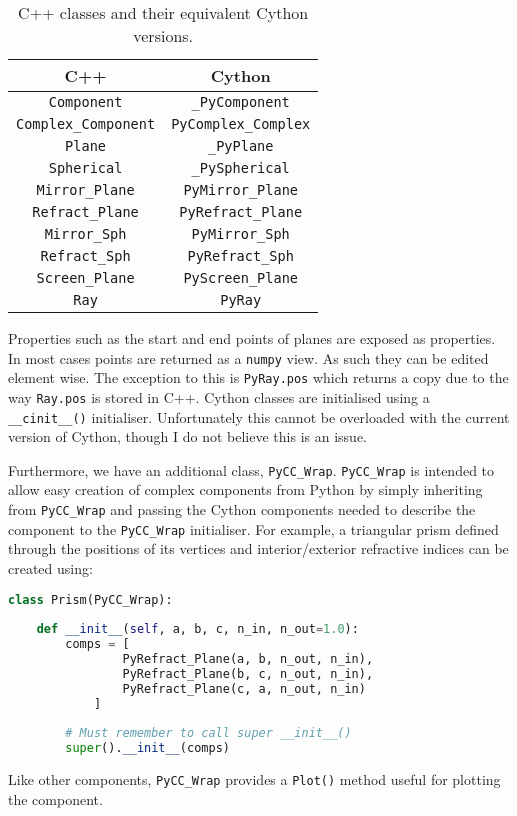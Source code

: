 \documentclass{article}
\begin{document}
\begin{table}[h!]
\centering
    \begin{tabular}{ |c|c| } 
         \hline
         C++ & Cython \\ 
         \hline
         \texttt{Component} & \texttt{\_PyComponent} \\ 
         \texttt{Complex\_Component} & \texttt{PyComplex\_Complex} \\ 
         \texttt{Plane} & \texttt{\_PyPlane} \\ 
         \texttt{Spherical} & \texttt{\_PySpherical} \\ 
         \texttt{Mirror\_Plane} & \texttt{PyMirror\_Plane} \\ 
         \texttt{Refract\_Plane} & \texttt{PyRefract\_Plane} \\ 
         \texttt{Mirror\_Sph} & \texttt{PyMirror\_Sph} \\ 
         \texttt{Refract\_Sph} & \texttt{PyRefract\_Sph} \\ 
         \texttt{Screen\_Plane} & \texttt{PyScreen\_Plane} \\
         \texttt{Ray} & \texttt{PyRay} \\ 
         \hline
         
    \end{tabular}
    \caption{C++ classes and their equivalent Cython versions.}
    \label{tab:C++ to Cython mappings}
\end{table}

Properties such as the start and end points of planes are exposed as properties. In most cases points are returned as a \texttt{numpy} view. As such they can be edited element wise. The exception to this is \texttt{PyRay.pos} which returns a copy due to the way \texttt{Ray.pos} is stored in C++. Cython classes are initialised using a \texttt{\_\_cinit\_\_()} initialiser. Unfortunately this cannot be overloaded with the current version of Cython, though I do not believe this is an issue.

Furthermore, we have an additional class, \texttt{PyCC\_Wrap}. \texttt{PyCC\_Wrap} is intended to allow easy creation of complex components from Python by simply inheriting from \texttt{PyCC\_Wrap} and passing the Cython components needed to describe the component to the \texttt{PyCC\_Wrap} initialiser. For example, a triangular prism defined through the positions of its vertices and interior/exterior refractive indices can be created using:
\begin{lstlisting}[language=Python]
class Prism(PyCC_Wrap):
    
    def __init__(self, a, b, c, n_in, n_out=1.0):
        comps = [
                PyRefract_Plane(a, b, n_out, n_in),
                PyRefract_Plane(b, c, n_out, n_in),
                PyRefract_Plane(c, a, n_out, n_in)
            ]
            
        # Must remember to call super __init__()
        super().__init__(comps)  
\end{lstlisting}
Like other components, \texttt{PyCC\_Wrap} provides a \texttt{Plot()} method useful for plotting the component.
\end{document}
